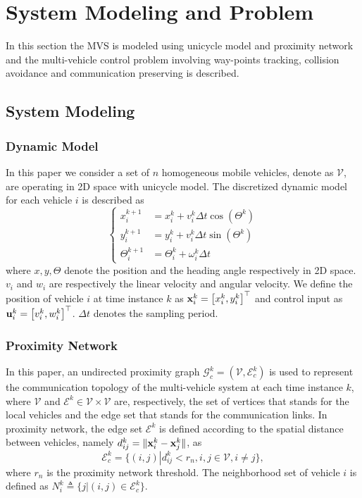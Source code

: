 \documentclass[letterpaper,10 pt,conference]{ieeeconf}
\begin{document}
\section{System Modeling and Problem}
In this section the MVS is modeled using unicycle model and proximity network and the multi-vehicle control problem involving way-points tracking, collision avoidance and communication preserving is described.
\subsection{System Modeling}
\subsubsection{Dynamic Model}
In this paper we consider a set of $n$ homogeneous mobile vehicles, denote as $\mathcal{V}$, are operating in 2D space with unicycle model. The discretized dynamic model for each vehicle $i$ is described as 
\begin{equation}\label{dynamic}\left\{
\begin{split}
x_i^{k + 1} &=x_i^{k} + v_i^{k}\Delta t \cos\left(\Theta^{k}\right)\\
y_i^{k + 1} &= y_i^{k} + v_i^{k} \Delta t\sin\left(\Theta^{k}\right)\\
\Theta_i^{k + 1} &= \Theta_i^{k} + \omega_i^{k}\Delta t
\end{split}\right.
\end{equation}
where $x,y,\Theta$ denote  the position and the heading angle respectively in 2D space. $v_i$ and $w_i$ are respectively the linear velocity and angular velocity. We define the position of vehicle $i$ at time instance $k$ as $\mathbf{x}_i^k = \left[x_i^k,y_i^k\right]^\top$ and control input as $\mathbf{u}_i^k = \left[v_i^k, w_i^k\right]^\top$. $\Delta t$ denotes the sampling period.
\subsubsection{Proximity Network}
In this paper, an undirected proximity graph $\mathcal{G}_c^k=\left(\mathcal{V},\mathcal{E}_c^k\right)$ is used to represent the communication topology of the multi-vehicle system at each time instance $k$, where $\mathcal{V}$ and $\mathcal{E}^k \in \mathcal{V} \times \mathcal{V} $ are, respectively, the set of vertices that stands for the local vehicles and the edge set that stands for the communication links. In proximity network, the edge set $\mathcal{E}^k$ is defined according to the spatial distance between vehicles, namely $d_{ij}^k =\|\mathbf{x}^k_i - \mathbf{x}^k_j\|$,  as 
\begin{equation}
\mathcal{E}_c^k=\{\left(i,j\right)\left.\right|d_{ij}^k<r_n, i,j\in \mathcal{V}, i\ne j\},
\label{graph}
\end{equation}
where $r_n$ is the proximity network threshold. The neighborhood set of vehicle $i$ is defined as ${N}_i^k \triangleq \{j|(i,j)\in \mathcal{E}_c^k\}$. 
\end{document}
